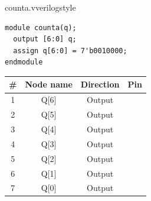 \begin{procedure}
  \begin{codepanel}{counta.v}{verilogstyle}
    \begin{lstlisting}
module counta(q);
  output [6:0] q;
  assign q[6:0] = 7'b0010000;
endmodule
\end{lstlisting}
  \end{codepanel}
  \vspace{-4pt}

  \needspace{4cm}
  \begin{boxedtable}
    \label{tab:exp3-pins}
    {\renewcommand{\arraystretch}{1.5}
      \centering
      \begin{tabular}{cccc}
        \toprule
        \# & Node name & Direction & Pin \\
        \midrule
        1  & Q[6]      & Output    &     \\
        2  & Q[5]      & Output    &     \\
        3  & Q[4]      & Output    &     \\
        4  & Q[3]      & Output    &     \\
        5  & Q[2]      & Output    &     \\
        6  & Q[1]      & Output    &     \\
        7  & Q[0]      & Output    &     \\
        \bottomrule
      \end{tabular}
    }
  \end{boxedtable}

\end{procedure}
